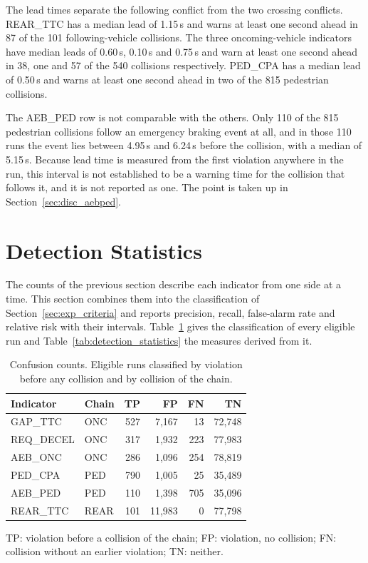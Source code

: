 The lead times separate the following conflict from the two crossing conflicts.
REAR\_TTC has a median lead of 1.15\,s and warns at least one second ahead in 87
of the 101 following-vehicle collisions. The three oncoming-vehicle indicators
have median leads of 0.60\,s, 0.10\,s and 0.75\,s and warn at least one second
ahead in 38, one and 57 of the 540 collisions respectively. PED\_CPA has a median
lead of 0.50\,s and warns at least one second ahead in two of the 815 pedestrian
collisions.

The AEB\_PED row is not comparable with the others. Only 110 of the 815
pedestrian collisions follow an emergency braking event at all, and in those 110
runs the event lies between 4.95\,s and 6.24\,s before the collision, with a
median of 5.15\,s. Because lead time is measured from the first violation
anywhere in the run, this interval is not established to be a warning time for
the collision that follows it, and it is not reported as one. The point is taken
up in Section~\ref{sec:disc_aebped}.

\section{Detection Statistics}
\label{sec:results_statistics}

The counts of the previous section describe each indicator from one side at a
time. This section combines them into the classification of
Section~\ref{sec:exp_criteria} and reports precision, recall, false-alarm rate
and relative risk with their intervals. Table~\ref{tab:confusion_counts} gives
the classification of every eligible run and
Table~\ref{tab:detection_statistics} the measures derived from it.

\begin{table}[htbp]
\centering
\caption[Confusion counts]{Confusion counts. Eligible runs classified by violation before any collision and by collision of the chain.}
\label{tab:confusion_counts}
\small
\begin{tabular}{@{}llrrrr@{}}
\toprule
{\bfseries Indicator} & {\bfseries Chain} & {\bfseries TP} & {\bfseries FP} & {\bfseries FN} & {\bfseries TN} \\
\midrule
GAP\_TTC & ONC & 527 & 7,167 & 13 & 72,748 \\
REQ\_DECEL & ONC & 317 & 1,932 & 223 & 77,983 \\
AEB\_ONC & ONC & 286 & 1,096 & 254 & 78,819 \\
PED\_CPA & PED & 790 & 1,005 & 25 & 35,489 \\
AEB\_PED & PED & 110 & 1,398 & 705 & 35,096 \\
REAR\_TTC & REAR & 101 & 11,983 & 0 & 77,798 \\
\bottomrule
\end{tabular}
\par\smallskip\footnotesize\raggedright TP: violation before a collision of the chain; FP: violation, no collision; FN: collision without an earlier violation; TN: neither.
\end{table}

